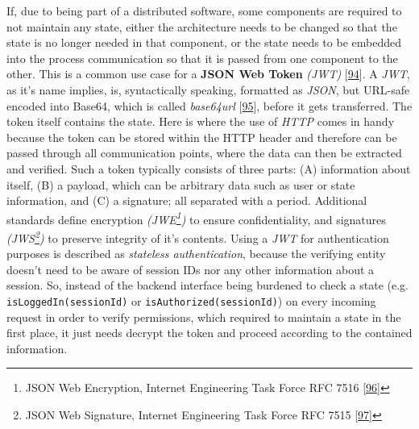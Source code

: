 \documentclass[12pt,english,a4paper,titlepage,cleardoublepage=empty,dottedtoc]{report}
\begin{document}
If, due to being part of a distributed software, some components are
required to not maintain any state, either the architecture needs to be
changed so that the state is no longer needed in that component, or the
state needs to be embedded into the process communication so that it is
passed from one component to the other. This is a common use case for a
\textbf{\protect\hypertarget{def--jwt}{}{JSON Web Token}} \emph{(JWT)}
{[}\protect\hyperlink{ref-web_spec_json-web-token}{94}{]}. A \emph{JWT},
as it's name implies, is, syntactically speaking, formatted as
\emph{JSON}, but URL-safe encoded into Base64, which is called
\emph{base64url} {[}\protect\hyperlink{ref-web_spec_base64url}{95}{]},
before it gets transferred. The token itself contains the state. Here is
where the use of \emph{HTTP} comes in handy because the token can be
stored within the HTTP header and therefore can be passed through all
communication points, where the data can then be extracted and verified.
Such a token typically consists of three parts: (A) information about
itself, (B) a payload, which can be arbitrary data such as user or state
information, and (C) a signature; all separated with a period.
Additional standards define encryption \emph{(JWE\footnote{JSON Web
  Encryption, Internet Engineering Task Force RFC 7516
  {[}\protect\hyperlink{ref-web_spec_json-web-encryption}{96}{]}})} to
ensure confidentiality, and signatures \emph{(JWS\footnote{JSON Web
  Signature, Internet Engineering Task Force RFC 7515
  {[}\protect\hyperlink{ref-web_spec_json-web-signature}{97}{]}})} to
preserve integrity of it's contents. Using a \emph{JWT} for
authentication purposes is described as \emph{stateless authentication},
because the verifying entity doesn't need to be aware of session IDs nor
any other information about a session. So, instead of the backend
interface being burdened to check a state (e.g.
\texttt{isLoggedIn(sessionId)} or \texttt{isAuthorized(sessionId)}) on
every incoming request in order to verify permissions, which required to
maintain a state in the first place, it just needs decrypt the token and
proceed according to the contained information.
\end{document}
